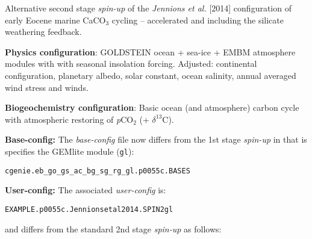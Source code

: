 \documentclass[10pt,twoside]{article}
\begin{document}
Alternative second stage \textsl{spin-up} of the \textit{Jennions et al.} [2014] configuration of early Eocene marine CaCO$_{3}$ cycling -- accelerated and including the silicate weathering feedback.

\noindent \textbf{Physics configuration}: GOLDSTEIN ocean + sea-ice + EMBM atmosphere modules with with seasonal insolation forcing. Adjusted: continental configuration, planetary albedo, solar constant, ocean salinity, annual averaged wind stress and winds.

\noindent \textbf{Biogeochemistry configuration}: Basic ocean (and atmosphere) carbon cycle with atmospheric restoring of \textit{p}CO$_{2}$ (+ $\delta^{13}$C).

\noindent \textbf{Base-config:} The \textit{base-config} file now differs from the 1st stage \textit{spin-up} in that is specifies the GEMlite module (\texttt{gl}):
\vspace{-10pt}\begin{verbatim}cgenie.eb_go_gs_ac_bg_sg_rg_gl.p0055c.BASES\end{verbatim}\vspace{-10pt}

\noindent \textbf{User-config:} The associated \textit{user-config} is:
\vspace{-10pt}\begin{verbatim}EXAMPLE.p0055c.Jennionsetal2014.SPIN2gl\end{verbatim}\vspace{-10pt}
and differs from the standard 2nd stage \textit{spin-up} as follows:
\end{document}
